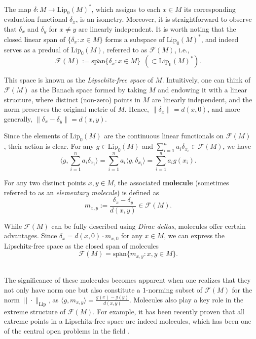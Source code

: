 \documentclass[12pt,english]{amsart}
\numberwithin{equation}{section}
\theoremstyle{plain}
\theoremstyle{definition}
\def\lip{ \text{Lip}}
\begin{document}
The map $\delta \colon M \to \lip_0(M)^*$, which assigns to each $x \in M$ its corresponding evaluation functional $\delta_x$, is an isometry. Moreover, it is straightforward to observe that $\delta_x$ and $\delta_y$ for $x \neq y$ are linearly independent. It is worth noting that the closed linear span of $\{\delta_x : x \in M\}$ forms a subspace of $\lip_0(M)^*$, and indeed serves as a predual of $\lip_0(M)$, referred to as $\mathcal{F}(M)$, i.e.,
\[
\mathcal{F}(M) := \overline{\text{span}}\{\delta_x : x \in M\} \ \ (\subset \lip_0(M)^*).
\]

This space is known as the \textit{Lipschitz-free space} of $M$. Intuitively, one can think of $\mathcal{F}(M)$ as the Banach space formed by taking $M$ and endowing it with a linear structure, where distinct (non-zero) points in $M$ are linearly independent, and the norm preserves the original metric of $M$. Hence, $\|\delta_x\| = d(x,0)$, and more generally, $\|\delta_x - \delta_y\| = d(x,y)$.

Since the elements of $\lip_0(M)$ are the continuous linear functionals on $\mathcal{F}(M)$, their action is clear. For any $g \in \lip_0(M)$ and $\sum_{i=1}^n a_i \delta_{x_i} \in \mathcal{F}(M)$, we have
\[
\langle g, \sum_{i=1}^n a_i \delta_{x_i} \rangle = \sum_{i=1}^n a_i \langle g, \delta_{x_i} \rangle = \sum_{i=1}^n a_i g(x_i).
\]

For any two distinct points $x, y \in M$, the associated \textbf{molecule} (sometimes referred to as an \textit{elementary molecule}) is defined as
\[
m_{x,y} := \frac{\delta_x - \delta_y}{d(x,y)} \in \mathcal{F}(M).
\]

While $\mathcal{F}(M)$ can be fully described using \textit{Dirac deltas}, molecules offer certain advantages. Since $\delta_x = d(x,0) \cdot m_{x,0}$ for any $x \in M$, we can express the Lipschitz-free space as the closed span of molecules
\[\mathcal{F}(M) = \overline{\text{span}}\{m_{x,y} : x,y \in M\}.\]\

The significance of these molecules becomes apparent when one realizes that they not only have norm one but also constitute a $1$-norming subset of $\mathcal{F}(M)$ for the norm $\|\cdot\|_{\text{Lip}}$, as $\langle g, m_{x,y} \rangle = \frac{g(x) - g(y)}{d(x,y)}$. Molecules also play a key role in the extreme structure of $\mathcal{F}(M)$. For example, it has been recently proven that all extreme points in a Lipschitz-free space are indeed molecules, which has been one of the central open problems in the field \cite{AlPerSm24p}.
\end{document}

